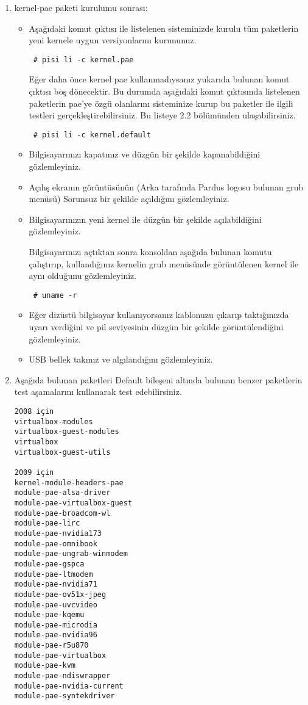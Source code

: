 \documentclass[a4paper,10pt]{article}
\begin{document}
\begin{enumerate}

 \item kernel-pae paketi kurulumu sonrası:

\begin{itemize}
\item
Aşağıdaki komut çıktısı ile listelenen sisteminizde kurulu tüm paketlerin yeni kernele uygun versiyonlarını kurununuz.
\begin{verbatim}
 # pisi li -c kernel.pae
\end{verbatim}

Eğer daha önce kernel pae kullanmadıysanız yukarıda bulunan komut çıktısı boş dönecektir. Bu durumda aşağıdaki komut çıktısında listelenen paketlerin pae'ye özgü olanlarını sisteminize kurup bu paketler ile ilgili testleri gerçekleştirebilirsiniz. Bu listeye 2.2 bölümünden ulaşabilirsiniz.

\begin{verbatim}
 # pisi li -c kernel.default
\end{verbatim}


\item Bilgisayarınızı kapatınız ve düzgün bir şekilde kapanabildiğini gözlemleyiniz.
\item Açılış ekranın görüntüsünün (Arka tarafında Pardus logosu bulunan grub menüsü) Sorunsuz bir şekilde açıldığını gözlemleyiniz.
\item Bilgisayarınızın yeni kernel ile düzgün bir şekilde açılabildiğini gözlemleyiniz.

Bilgisayarınızı açtıktan sonra konsoldan aşağıda bulunan komutu çalıştırıp, kullandığınız kernelin grub menüsünde görüntülenen kernel ile aynı olduğunu gözlemleyiniz.
\begin{verbatim}
 # uname -r 
\end{verbatim}

\item Eğer dizüstü bilgisayar kullanıyorsanız kablonuzu çıkarıp taktığınızda uyarı verdiğini ve pil seviyesinin düzgün bir şekilde görüntülendiğini gözlemleyiniz.
\item USB bellek takınız ve algılandığını gözlemleyiniz.
\end{itemize}

\item Aşağıda bulunan paketleri Default bileşeni altında bulunan benzer paketlerin test aşamalarını kullanarak test edebilirsiniz.

\begin{verbatim}
2008 için
virtualbox-modules
virtualbox-guest-modules
virtualbox
virtualbox-guest-utils

2009 için
kernel-module-headers-pae
module-pae-alsa-driver
module-pae-virtualbox-guest
module-pae-broadcom-wl
module-pae-lirc
module-pae-nvidia173
module-pae-omnibook
module-pae-ungrab-winmodem
module-pae-gspca
module-pae-ltmodem
module-pae-nvidia71
module-pae-ov51x-jpeg
module-pae-uvcvideo
module-pae-kqemu
module-pae-microdia
module-pae-nvidia96
module-pae-r5u870
module-pae-virtualbox
module-pae-kvm
module-pae-ndiswrapper
module-pae-nvidia-current
module-pae-syntekdriver   
\end{verbatim}
\end{enumerate}
\end{document}
